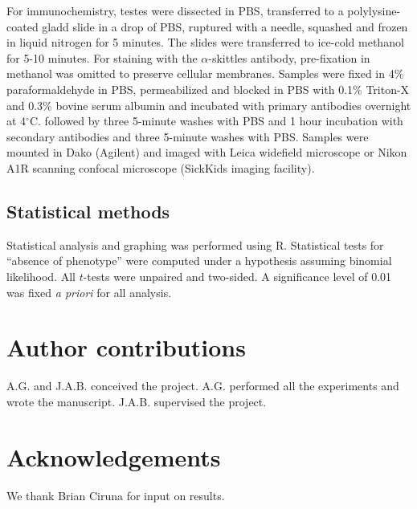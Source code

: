 \documentclass[12pt, twoside, letterpaper]{article}
\begin{document}
For immunochemistry, testes were dissected in PBS,
transferred to a polylysine-coated gladd slide in a drop of PBS,
ruptured with a needle, squashed and frozen in liquid nitrogen for 5 minutes.
The slides were transferred to ice-cold methanol for 5-10 minutes.
For staining with the $\alpha$-skittles antibody, pre-fixation in methanol
was omitted to preserve cellular membranes.
Samples were fixed in 4\% paraformaldehyde in PBS,
permeabilized and blocked in PBS with 0.1\% Triton-X and 0.3\% bovine
serum albumin and incubated with primary antibodies overnight at 4$^{\circ}$C.
followed by three 5-minute washes with PBS and 1 hour incubation
with secondary antibodies and three 5-minute washes with PBS.
Samples were mounted in Dako (Agilent) and imaged with Leica widefield microscope
or Nikon A1R scanning confocal microscope (SickKids imaging facility).

\subsection{Statistical methods}
Statistical analysis and graphing was performed using R.
Statistical tests for ``absence of phenotype'' were computed under a
hypothesis assuming binomial likelihood.
All $t$-tests were unpaired and two-sided.
A significance level of 0.01 was fixed \textit{a priori} for all analysis.

\section{Author contributions}
A.G. and J.A.B. conceived the project.
A.G. performed all the experiments and wrote the manuscript.
J.A.B. supervised the project.


\section{Acknowledgements}
We thank Brian Ciruna for input on results.


\end{document}
